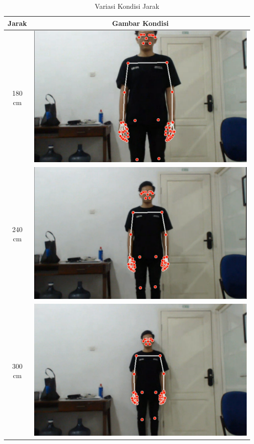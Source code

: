 \newpage
\begin{longtable}{|c|c|}
  \caption{Variasi Kondisi Jarak}
  \label{tb:kondisijarak}                                   \\
  \hline
  \rowcolor[HTML]{C0C0C0}
  \textbf{Jarak} & \textbf{Gambar Kondisi}  \\
  \hline
  180 cm            &  \includegraphics[scale=0.17]{gambar/bab4-jarak300.png}                \\
  \hline
  240 cm            & \includegraphics[scale=0.17]{gambar/bab4-jarak240.png}                 \\
  \hline
  300 cm            & \includegraphics[scale=0.17]{gambar/bab4-jarak180.png}                 \\
  \hline
\end{longtable}

